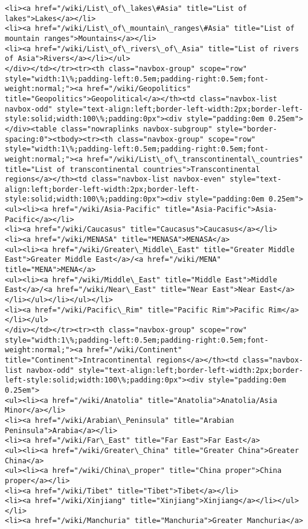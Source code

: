 \documentclass[11pt]{article}
\begin{document}
\begin{Verbatim}[commandchars=\\\{\}]
<li><a href="/wiki/List\_of\_lakes\#Asia" title="List of lakes">Lakes</a></li>
<li><a href="/wiki/List\_of\_mountain\_ranges\#Asia" title="List of mountain ranges">Mountains</a></li>
<li><a href="/wiki/List\_of\_rivers\_of\_Asia" title="List of rivers of Asia">Rivers</a></li></ul>
</div></td></tr><tr><th class="navbox-group" scope="row" style="width:1\%;padding-left:0.5em;padding-right:0.5em;font-weight:normal;"><a href="/wiki/Geopolitics" title="Geopolitics">Geopolitical</a></th><td class="navbox-list navbox-odd" style="text-align:left;border-left-width:2px;border-left-style:solid;width:100\%;padding:0px"><div style="padding:0em 0.25em"></div><table class="nowraplinks navbox-subgroup" style="border-spacing:0"><tbody><tr><th class="navbox-group" scope="row" style="width:1\%;padding-left:0.5em;padding-right:0.5em;font-weight:normal;"><a href="/wiki/List\_of\_transcontinental\_countries" title="List of transcontinental countries">Transcontinental regions</a></th><td class="navbox-list navbox-even" style="text-align:left;border-left-width:2px;border-left-style:solid;width:100\%;padding:0px"><div style="padding:0em 0.25em">
<ul><li><a href="/wiki/Asia-Pacific" title="Asia-Pacific">Asia-Pacific</a></li>
<li><a href="/wiki/Caucasus" title="Caucasus">Caucasus</a></li>
<li><a href="/wiki/MENASA" title="MENASA">MENASA</a>
<ul><li><a href="/wiki/Greater\_Middle\_East" title="Greater Middle East">Greater Middle East</a>/<a href="/wiki/MENA" title="MENA">MENA</a>
<ul><li><a href="/wiki/Middle\_East" title="Middle East">Middle East</a>/<a href="/wiki/Near\_East" title="Near East">Near East</a></li></ul></li></ul></li>
<li><a href="/wiki/Pacific\_Rim" title="Pacific Rim">Pacific Rim</a></li></ul>
</div></td></tr><tr><th class="navbox-group" scope="row" style="width:1\%;padding-left:0.5em;padding-right:0.5em;font-weight:normal;"><a href="/wiki/Continent" title="Continent">Intracontinental regions</a></th><td class="navbox-list navbox-odd" style="text-align:left;border-left-width:2px;border-left-style:solid;width:100\%;padding:0px"><div style="padding:0em 0.25em">
<ul><li><a href="/wiki/Anatolia" title="Anatolia">Anatolia/Asia Minor</a></li>
<li><a href="/wiki/Arabian\_Peninsula" title="Arabian Peninsula">Arabia</a></li>
<li><a href="/wiki/Far\_East" title="Far East">Far East</a>
<ul><li><a href="/wiki/Greater\_China" title="Greater China">Greater China</a>
<ul><li><a href="/wiki/China\_proper" title="China proper">China proper</a></li>
<li><a href="/wiki/Tibet" title="Tibet">Tibet</a></li>
<li><a href="/wiki/Xinjiang" title="Xinjiang">Xinjiang</a></li></ul></li>
<li><a href="/wiki/Manchuria" title="Manchuria">Greater Manchuria</a>

\end{Verbatim}
\end{document}
